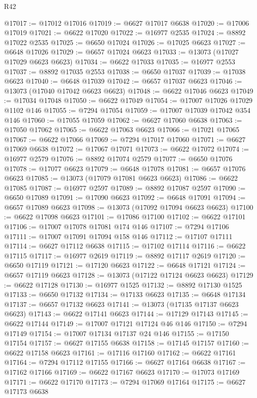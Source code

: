 \begin{lexlean}{R42}
\begin{coremodule}
{@17017 := @17012 @17016
@17019 := @6627 @17017 @6638
@17020 := @17006 @17019
@17021 := @6622 @17020
@17022 := @16977 @2535
@17024 := @8892 @17022 @2535
@17025 := @6650 @17024
@17026 := @17025 @6623
@17027 := @6648 @17026
@17029 := @6657 @17024 @6623
@17033 := @13073 (@17027 @17029 @6623 @6623)
@17034 := @6622 @17033
@17035 := @16977 @2553
@17037 := @8892 @17035 @2553
@17038 := @6650 @17037
@17039 := @17038 @6623
@17040 := @6648 @17039
@17042 := @6657 @17037 @6623
@17046 := @13073 (@17040 @17042 @6623 @6623)
@17048 := @6622 @17046 @6623
@17049 := @17034 @17048
@17050 := @6622 @17049
@17054 := @17007 @17026 @17029 @1102 @146
@17055 := @7294 @17054
@17059 := @17007 @17039 @17042 @354 @146
@17060 := @17055 @17059
@17062 := @6627 @17060 @6638
@17063 := @17050 @17062
@17065 := @6622 @17063 @6623
@17066 := @17021 @17065
@17067 := @6622 @17066
@17069 := @7294 @17017 @17060
@17071 := @6627 @17069 @6638
@17072 := @17067 @17071
@17073 := @6622 @17072
@17074 := @16977 @2579
@17076 := @8892 @17074 @2579
@17077 := @6650 @17076
@17078 := @17077 @6623
@17079 := @6648 @17078
@17081 := @6657 @17076 @6623
@17085 := @13073 (@17079 @17081 @6623 @6623)
@17086 := @6622 @17085
@17087 := @16977 @2597
@17089 := @8892 @17087 @2597
@17090 := @6650 @17089
@17091 := @17090 @6623
@17092 := @6648 @17091
@17094 := @6657 @17089 @6623
@17098 := @13073 (@17092 @17094 @6623 @6623)
@17100 := @6622 @17098 @6623
@17101 := @17086 @17100
@17102 := @6622 @17101
@17106 := @17007 @17078 @17081 @174 @146
@17107 := @7294 @17106
@17111 := @17007 @17091 @17094 @158 @146
@17112 := @17107 @17111
@17114 := @6627 @17112 @6638
@17115 := @17102 @17114
@17116 := @6622 @17115
@17117 := @16977 @2619
@17119 := @8892 @17117 @2619
@17120 := @6650 @17119
@17121 := @17120 @6623
@17122 := @6648 @17121
@17124 := @6657 @17119 @6623
@17128 := @13073 (@17122 @17124 @6623 @6623)
@17129 := @6622 @17128
@17130 := @16977 @1525
@17132 := @8892 @17130 @1525
@17133 := @6650 @17132
@17134 := @17133 @6623
@17135 := @6648 @17134
@17137 := @6657 @17132 @6623
@17141 := @13073 (@17135 @17137 @6623 @6623)
@17143 := @6622 @17141 @6623
@17144 := @17129 @17143
@17145 := @6622 @17144
@17149 := @17007 @17121 @17124 @46 @146
@17150 := @7294 @17149
@17154 := @17007 @17134 @17137 @24 @146
@17155 := @17150 @17154
@17157 := @6627 @17155 @6638
@17158 := @17145 @17157
@17160 := @6622 @17158 @6623
@17161 := @17116 @17160
@17162 := @6622 @17161
@17164 := @7294 @17112 @17155
@17166 := @6627 @17164 @6638
@17167 := @17162 @17166
@17169 := @6622 @17167 @6623
@17170 := @17073 @17169
@17171 := @6622 @17170
@17173 := @7294 @17069 @17164
@17175 := @6627 @17173 @6638
}
\end{coremodule}
\end{lexlean}
